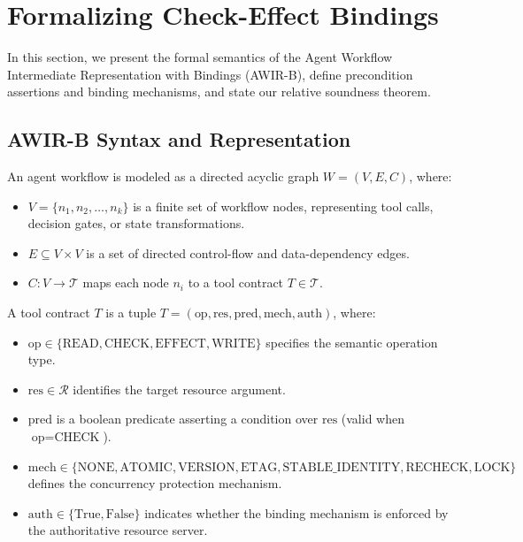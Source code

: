 \section{Formalizing Check-Effect Bindings}
\label{sec:formalization}

In this section, we present the formal semantics of the Agent Workflow Intermediate Representation with Bindings (\textsf{AWIR-B}), define precondition assertions and binding mechanisms, and state our relative soundness theorem.

\subsection{AWIR-B Syntax and Representation}
An agent workflow is modeled as a directed acyclic graph $W = (V, E, C)$, where:
\begin{itemize}
    \item $V = \{n_1, n_2, \dots, n_k\}$ is a finite set of workflow nodes, representing tool calls, decision gates, or state transformations.
    \item $E \subseteq V \times V$ is a set of directed control-flow and data-dependency edges.
    \item $C: V \to \mathcal{T}$ maps each node $n_i$ to a tool contract $T \in \mathcal{T}$.
\end{itemize}

\begin{definition}
A tool contract $T$ is a tuple $T = (\text{op}, \text{res}, \text{pred}, \text{mech}, \text{auth})$, where:
\begin{itemize}
    \item $\text{op} \in \{\text{READ}, \text{CHECK}, \text{EFFECT}, \text{WRITE}\}$ specifies the semantic operation type.
    \item $\text{res} \in \mathcal{R}$ identifies the target resource argument.
    \item $\text{pred}$ is a boolean predicate asserting a condition over $\text{res}$ (valid when $\text{op} = \text{CHECK}$).
    \item $\text{mech} \in \{\text{NONE}, \text{ATOMIC}, \text{VERSION}, \text{ETAG}, \text{STABLE\_IDENTITY}, \text{RECHECK}, \text{LOCK}\}$ defines the concurrency protection mechanism.
    \item $\text{auth} \in \{\text{True}, \text{False}\}$ indicates whether the binding mechanism is enforced by the authoritative resource server.
\end{itemize}
\end{definition}

